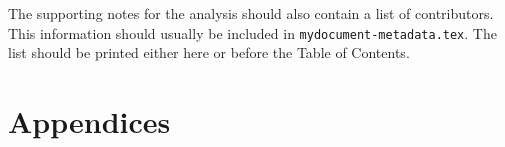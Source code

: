 \documentclass[NOTE, atlasdraft=true, texlive=2016, UKenglish]{\ATLASLATEXPATH atlasdoc}
\begin{document}
\maketitle

\tableofcontents





\clearpage

\clearpage

\clearpage

\clearpage

\clearpage

\clearpage

\clearpage

\clearpage

\clearpage

\clearpage

\clearpage

\FloatBarrier



\printbibliography
%
%

\clearpage
The supporting notes for the analysis should also contain a list of contributors.
This information should usually be included in \texttt{mydocument-metadata.tex}.
The list should be printed either here or before the Table of Contents.


\clearpage
\appendix
\part*{Appendices}


\clearpage

\clearpage

\clearpage

\clearpage

\clearpage

\end{document}
